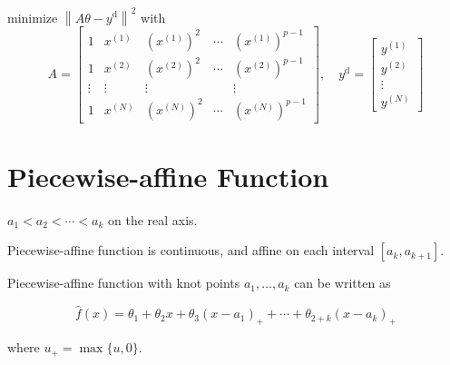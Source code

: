 \begin{problem} 
    minimize $ \left\|A \theta-y^{\mathrm{d}}\right\|^{2} $ with
    \begin{equation}
    A=\left[\begin{array}{ccccc}
    1 & x^{(1)} & \left(x^{(1)}\right)^{2} & \cdots & \left(x^{(1)}\right)^{p-1} \\
    1 & x^{(2)} & \left(x^{(2)}\right)^{2} & \cdots & \left(x^{(2)}\right)^{p-1} \\
    \vdots & \vdots & \vdots & & \vdots \\
    1 & x^{(N)} & \left(x^{(N)}\right)^{2} & \cdots & \left(x^{(N)}\right)^{p-1}
    \end{array}\right], \quad y^{\mathrm{d}}=\left[\begin{array}{c}
    y^{(1)} \\
    y^{(2)} \\
    \vdots \\
    y^{(N)}
    \end{array}\right]
    \end{equation}
\end{problem}


\section{Piecewise-affine Function}

\begin{definition}
    $ a_{1}<a_{2}<\cdots<a_{k} $ on the real axis.
\end{definition}

\begin{proposition}
    Piecewise-affine function is continuous, and affine on each interval $ \left[a_{k}, a_{k+1}\right] $.
\end{proposition}

\begin{theorem}
    Piecewise-affine function with knot points $ a_{1}, \ldots, a_{k} $ can be written as

    \begin{equation}
    \hat{f}(x)=\theta_{1}+\theta_{2} x+\theta_{3}\left(x-a_{1}\right)_{+}+\cdots+\theta_{2+k}\left(x-a_{k}\right)_{+}
    \end{equation}

    where $ u_{+}=\max \{u, 0\} $.
\end{theorem}



